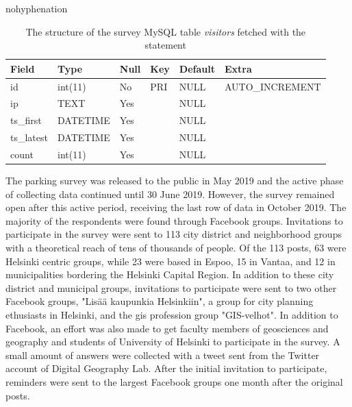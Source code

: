 \begin{hyphenrules}{nohyphenation}
    \begin{table}[H]
        \centering
        \setlength\tabcolsep{1.2ex}
        \caption[Structure of MySQL table visitors]{The structure of the survey MySQL table \textit{visitors} fetched with the statement } 
        \label{tab:mysql_visitors_str}
        \begin{tabular}{ @{} >{\raggedright\arraybackslash}p{2cm} >{\raggedright\arraybackslash}p{2cm} >{\raggedright\arraybackslash}p{1cm} >{\raggedright\arraybackslash}p{1cm} >{\raggedright\arraybackslash}p{1.5cm} >{\raggedleft\arraybackslash}p{4cm} @{} }
            \toprule
            Field & Type & Null & Key & Default & Extra \\
            \midrule
            id & int(11) & No & PRI & NULL & AUTO\_INCREMENT \\
            ip & TEXT & Yes & & NULL & \\
            ts\_first & DATETIME & Yes & & NULL & \\
            ts\_latest & DATETIME & Yes & & NULL & \\
            count & int(11) & Yes & & NULL & \\        
            \bottomrule
        \end{tabular}
    \end{table} 
\end{hyphenrules}

The parking survey was released to the public in May 2019 and the active phase of collecting data continued until 30 June 2019. However, the survey remained open after this active period, receiving the last row of data in October 2019. The majority of the respondents were found through Facebook groups. Invitations to participate in the survey were sent to 113 city district and neighborhood groups with a theoretical reach of tens of thousands of people. Of the 113 posts, 63 were Helsinki centric groups, while 23 were based in Espoo, 15 in Vantaa, and 12 in municipalities bordering the Helsinki Capital Region. In addition to these city district and municipal groups, invitations to participate were sent to two other Facebook groups, "Lisää kaupunkia Helsinkiin", a group for city planning ethusiasts in Helsinki, and the \acrshort{gis} profession group "GIS-velhot". In addition to Facebook, an effort was also made to get faculty members of geosciences and geography and students of University of Helsinki to participate in the survey. A small amount of answers were collected with a tweet sent from the Twitter account of Digital Geography Lab. After the initial invitation to participate, reminders were sent to the largest Facebook groups one month after the original posts.

